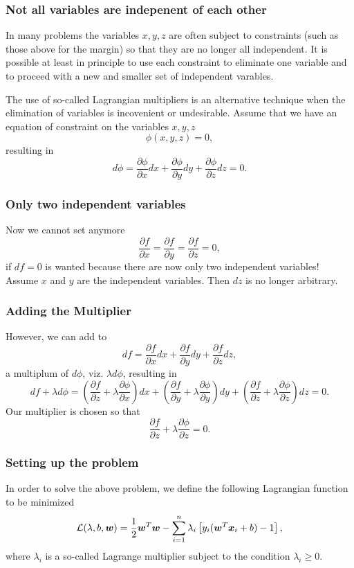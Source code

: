\documentclass{beamer}
\begin{document}
\begin{frame}
\frametitle{Not all variables are indepenent of each other}

In many problems the variables $x,y,z$ are often subject to constraints (such as those above for the margin)
so that they are no longer all independent. It is possible at least in principle to use each 
constraint to eliminate one variable
and to proceed with a new and smaller set of independent varables.

The use of so-called Lagrangian  multipliers is an alternative technique  when the elimination
of variables is incovenient or undesirable.  Assume that we have an equation of constraint on 
the variables $x,y,z$
\[
\phi(x,y,z) = 0,
\]
 resulting in
\[
d\phi = \frac{\partial \phi}{\partial x}dx+\frac{\partial \phi}{\partial y}dy+\frac{\partial \phi}{\partial z}dz =0.
\]
\end{frame}

\begin{frame}
\frametitle{Only two independent variables}

Now we cannot set anymore
\[
\frac{\partial f}{\partial x} =\frac{\partial f}{\partial y}=\frac{\partial f}{\partial z}=0,
\]
if $df=0$ is wanted
because there are now only two independent variables!  Assume $x$ and $y$ are the independent 
variables.
Then $dz$ is no longer arbitrary.
\end{frame}

\begin{frame}
\frametitle{Adding the Multiplier}

However, we can add to
\[
df = \frac{\partial f}{\partial x}dx+\frac{\partial f}{\partial y}dy+\frac{\partial f}{\partial z}dz,
\]
a multiplum of $d\phi$, viz. $\lambda d\phi$, resulting  in
\[
df+\lambda d\phi = (\frac{\partial f}{\partial z}+\lambda
\frac{\partial \phi}{\partial x})dx+(\frac{\partial f}{\partial y}+\lambda\frac{\partial \phi}{\partial y})dy+
(\frac{\partial f}{\partial z}+\lambda\frac{\partial \phi}{\partial z})dz =0.
\]
Our multiplier is chosen so that
\[
\frac{\partial f}{\partial z}+\lambda\frac{\partial \phi}{\partial z} =0.
\]
\end{frame}

\begin{frame}
\frametitle{Setting up the problem}

In order to solve the above problem, we define the following Lagrangian function to be minimized 
\[
{\cal L}(\lambda,b,\bm{w})=\frac{1}{2}\bm{w}^T\bm{w}-\sum_{i=1}^n\lambda_i\left[y_i(\bm{w}^T\bm{x}_i+b)-1\right],
\]
where $\lambda_i$ is a so-called Lagrange multiplier subject to the condition $\lambda_i \geq 0$.
\end{frame}
\end{document}
